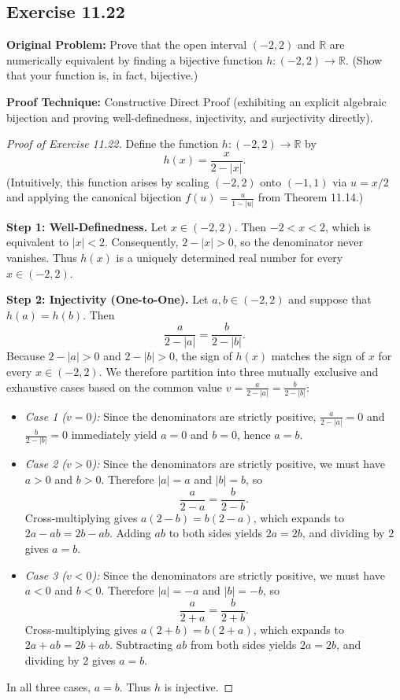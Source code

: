 \documentclass[11pt, letterpaper]{article}
\theoremstyle{definition}
\theoremstyle{remark}
\begin{document}
\subsection{Exercise 11.22}

\textbf{Original Problem:} Prove that the open interval $(-2, 2)$ and $\mathbb{R}$ are numerically equivalent by finding a bijective function $h : (-2, 2) \to \mathbb{R}$. (Show that your function is, in fact, bijective.)

\medskip
\textbf{Proof Technique:} Constructive Direct Proof (exhibiting an explicit algebraic bijection and proving well-definedness, injectivity, and surjectivity directly).

\begin{proof}[Proof of Exercise 11.22]
Define the function $h : (-2, 2) \to \mathbb{R}$ by
\[
h(x) = \frac{x}{2 - |x|}.
\]
(Intuitively, this function arises by scaling $(-2, 2)$ onto $(-1, 1)$ via $u = x/2$ and applying the canonical bijection $f(u) = \frac{u}{1 - |u|}$ from Theorem 11.14.)

\textbf{Step 1: Well-Definedness.} Let $x \in (-2, 2)$. Then $-2 < x < 2$, which is equivalent to $|x| < 2$. Consequently, $2 - |x| > 0$, so the denominator never vanishes. Thus $h(x)$ is a uniquely determined real number for every $x \in (-2, 2)$.

\textbf{Step 2: Injectivity (One-to-One).} Let $a, b \in (-2, 2)$ and suppose that $h(a) = h(b)$. Then
\[
\frac{a}{2 - |a|} = \frac{b}{2 - |b|}.
\]
Because $2 - |a| > 0$ and $2 - |b| > 0$, the sign of $h(x)$ matches the sign of $x$ for every $x \in (-2, 2)$. We therefore partition into three mutually exclusive and exhaustive cases based on the common value $v = \frac{a}{2 - |a|} = \frac{b}{2 - |b|}$:
\begin{itemize}
    \item \emph{Case 1 ($v = 0$):} Since the denominators are strictly positive, $\frac{a}{2 - |a|} = 0$ and $\frac{b}{2 - |b|} = 0$ immediately yield $a = 0$ and $b = 0$, hence $a = b$.
    \item \emph{Case 2 ($v > 0$):} Since the denominators are strictly positive, we must have $a > 0$ and $b > 0$. Therefore $|a| = a$ and $|b| = b$, so
    \[
    \frac{a}{2 - a} = \frac{b}{2 - b}.
    \]
    Cross-multiplying gives $a(2 - b) = b(2 - a)$, which expands to $2a - ab = 2b - ab$. Adding $ab$ to both sides yields $2a = 2b$, and dividing by $2$ gives $a = b$.
    \item \emph{Case 3 ($v < 0$):} Since the denominators are strictly positive, we must have $a < 0$ and $b < 0$. Therefore $|a| = -a$ and $|b| = -b$, so
    \[
    \frac{a}{2 + a} = \frac{b}{2 + b}.
    \]
    Cross-multiplying gives $a(2 + b) = b(2 + a)$, which expands to $2a + ab = 2b + ab$. Subtracting $ab$ from both sides yields $2a = 2b$, and dividing by $2$ gives $a = b$.
\end{itemize}
In all three cases, $a = b$. Thus $h$ is injective.


\end{proof}
\end{document}
